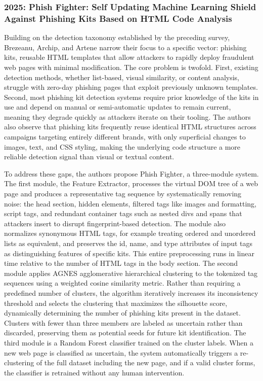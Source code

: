 \documentclass[conference]{IEEEtran}
\begin{document}
\subsubsection{2025: Phish Fighter: Self Updating Machine Learning Shield Against Phishing Kits Based on HTML Code Analysis}
Building on the detection taxonomy established by the preceding survey, Brezeanu, Archip, and Artene narrow their focus to a specific vector: phishing kits,  reusable HTML templates that allow attackers to rapidly deploy fraudulent web pages with minimal modification\cite{brezeanu_phish_2025}. The core problem is twofold. First, existing detection methods, whether list-based, visual similarity, or content analysis, struggle with zero-day phishing pages that exploit previously unknown templates. Second, most phishing kit detection systems require prior knowledge of the kits in use and depend on manual or semi-automatic updates to remain current, meaning they degrade quickly as attackers iterate on their tooling\cite{brezeanu_phish_2025}. The authors also observe that phishing kits frequently reuse identical HTML structures across campaigns targeting entirely different brands, with only superficial changes to images, text, and CSS styling, making the underlying code structure a more reliable detection signal than visual or textual content\cite{brezeanu_phish_2025}.

To address these gaps, the authors propose Phish Fighter, a three-module system. The first module, the Feature Extractor, processes the virtual DOM tree of a web page and produces a representative tag sequence by systematically removing noise: the head section, hidden elements, filtered tags like images and formatting, script tags, and redundant container tags such as nested divs and spans that attackers insert to disrupt fingerprint-based detection\cite{brezeanu_phish_2025}. The module also normalizes synonymous HTML tags, for example treating ordered and unordered lists as equivalent, and preserves the id, name, and type attributes of input tags as distinguishing features of specific kits. This entire preprocessing runs in linear time relative to the number of HTML tags in the body section\cite{brezeanu_phish_2025}. The second module applies AGNES agglomerative hierarchical clustering to the tokenized tag sequences using a weighted cosine similarity metric. Rather than requiring a predefined number of clusters, the algorithm iteratively increases its inconsistency threshold and selects the clustering that maximizes the silhouette score, dynamically determining the number of phishing kits present in the dataset\cite{brezeanu_phish_2025}. Clusters with fewer than three members are labeled as uncertain rather than discarded, preserving them as potential seeds for future kit identification. The third module is a Random Forest classifier trained on the cluster labels. When a new web page is classified as uncertain, the system automatically triggers a re-clustering of the full dataset including the new page, and if a valid cluster forms, the classifier is retrained without any human intervention\cite{brezeanu_phish_2025}.
\end{document}
